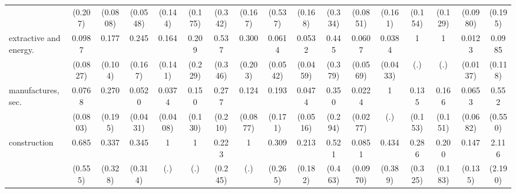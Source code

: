 {\begin{tabular}{l*{16}{c}}
                    &     (0.207)         &    (0.0808)         &    (0.0548)         &     (0.144)         &     (0.175)         &     (0.342)         &     (0.167)         &     (0.537)         &     (0.168)         &     (0.334)         &    (0.0851)         &     (0.161)         &     (0.154)         &     (0.129)         &    (0.0980)         &     (0.195)         \\
[1em]
extractive and energy.&      0.0987\sym{**} &       0.177\sym{**} &       0.245\sym{*}  &       0.164\sym{*}  &       0.209         &       0.537         &       0.300         &      0.0614\sym{**} &      0.0532\sym{***}&       0.445         &      0.0607\sym{**} &      0.0384\sym{**} &           1         &           1         &      0.0123\sym{***}&      0.0985         \\
                    &    (0.0827)         &     (0.104)         &     (0.167)         &     (0.141)         &     (0.229)         &     (0.346)         &     (0.203)         &    (0.0542)         &    (0.0459)         &     (0.379)         &    (0.0569)         &    (0.0433)         &         (.)         &         (.)         &    (0.0137)         &     (0.118)         \\
[1em]
manufactures, sec.  &      0.0768\sym{*}  &       0.270         &      0.0520\sym{***}&      0.0374\sym{**} &       0.150\sym{*}  &       0.277         &       0.124\sym{**} &       0.193         &      0.0474\sym{**} &       0.350         &      0.0224\sym{**} &           1         &       0.135         &       0.166\sym{*}  &      0.0653\sym{**} &       0.552         \\
                    &    (0.0803)         &     (0.195)         &    (0.0431)         &    (0.0408)         &     (0.130)         &     (0.210)         &    (0.0877)         &     (0.171)         &    (0.0516)         &     (0.294)         &    (0.0277)         &         (.)         &     (0.153)         &     (0.151)         &    (0.0682)         &     (0.550)         \\
[1em]
construction        &       0.685         &       0.337         &       0.345         &           1         &           1         &       0.223         &           1         &       0.309         &       0.213         &       0.521         &      0.0851\sym{*}  &       0.434         &       0.286         &       0.200         &       0.147\sym{*}  &       2.116         \\
                    &     (0.555)         &     (0.328)         &     (0.314)         &         (.)         &         (.)         &     (0.245)         &         (.)         &     (0.265)         &     (0.182)         &     (0.463)         &    (0.0970)         &     (0.389)         &     (0.325)         &     (0.183)         &     (0.135)         &     (2.190)         \\

\end{tabular}}
